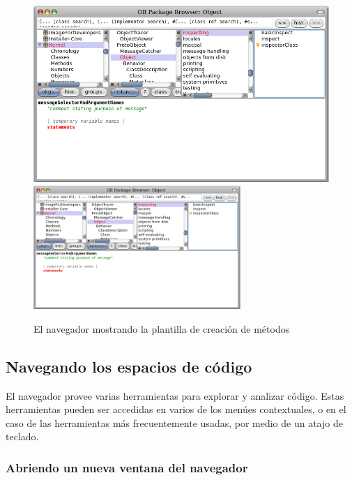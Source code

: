 \documentclass[spanish,a4paper,10pt,twoside]{book}
\begin{document}
\begin{figure}[htbp]
   \centering
   \ifluluelse
	   {\includegraphics [width=\textwidth]{SystemBrowserMethodTemplate}}
	   {\includegraphics[width=0.7\textwidth]{SystemBrowserMethodTemplate}}
   \caption{El navegador mostrando la plantilla de creaci\'on de m\'etodos
   }
\end{figure}

\subsection{Navegando los espacios de c\'odigo}

El navegador provee varias herramientas para explorar y analizar c\'odigo.
Estas herramientas pueden ser accedidas  en varios de los men\'ues
contextuales, o en el caso de las herramientas m\'as frecuentemente usadas, por
medio de un atajo de teclado.

\subsubsection{Abriendo un nueva ventana del navegador}
\end{document}
